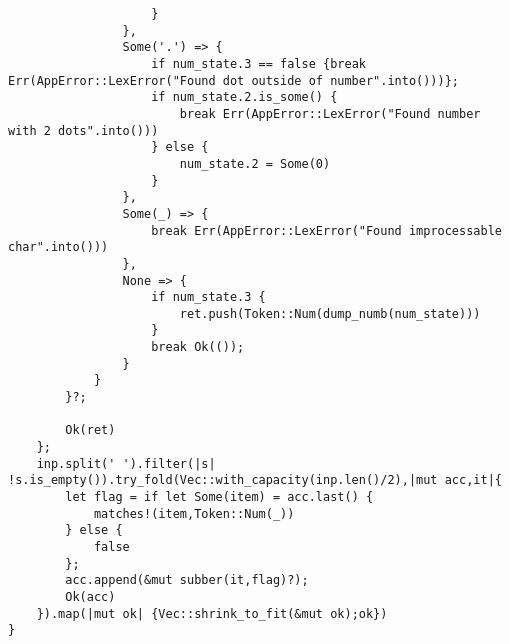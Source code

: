 \begin{verbatim}
                    }
                },
                Some('.') => {
                    if num_state.3 == false {break Err(AppError::LexError("Found dot outside of number".into()))};
                    if num_state.2.is_some() {
                        break Err(AppError::LexError("Found number with 2 dots".into()))
                    } else {
                        num_state.2 = Some(0)
                    }
                },
                Some(_) => {
                    break Err(AppError::LexError("Found improcessable char".into()))
                },
                None => {
                    if num_state.3 {
                        ret.push(Token::Num(dump_numb(num_state)))
                    }
                    break Ok(());
                }
            }
        }?;

        Ok(ret)
    };
    inp.split(' ').filter(|s| !s.is_empty()).try_fold(Vec::with_capacity(inp.len()/2),|mut acc,it|{
        let flag = if let Some(item) = acc.last() {
            matches!(item,Token::Num(_))
        } else {
            false
        };
        acc.append(&mut subber(it,flag)?);
        Ok(acc)
    }).map(|mut ok| {Vec::shrink_to_fit(&mut ok);ok})
}

\end{verbatim}
